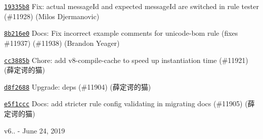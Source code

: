 \begin{DoxyItemize}
\item \href{https://github.com/eslint/eslint/commit/19335b8f47029b2f742d5507ba39484eaf68d07b}{\texttt{ {\ttfamily 19335b8}}} Fix\+: actual message\+Id and expected message\+Id are switched in rule tester (\#11928) (Milos Djermanovic)
\item \href{https://github.com/eslint/eslint/commit/8b216e04fb0dd0a1a4d3730ebe4b24780020b09c}{\texttt{ {\ttfamily 8b216e0}}} Docs\+: Fix incorrect example comments for unicode-\/bom rule (fixes \#11937) (\#11938) (Brandon Yeager)
\item \href{https://github.com/eslint/eslint/commit/cc3885b028e29ebc575c900f43af81cb0dabffb6}{\texttt{ {\ttfamily cc3885b}}} Chore\+: add v8-\/compile-\/cache to speed up instantiation time (\#11921) (薛定谔的猫)
\item \href{https://github.com/eslint/eslint/commit/d8f26886f19a17f2e1cdcb91e2db84fc7ba3fdfb}{\texttt{ {\ttfamily d8f2688}}} Upgrade\+: deps (\#11904) (薛定谔的猫)
\item \href{https://github.com/eslint/eslint/commit/e5f1ccc9e2d07ad0acf149027ffc382021d54da1}{\texttt{ {\ttfamily e5f1ccc}}} Docs\+: add \textquotesingle{}stricter rule config validating\textquotesingle{} in migrating docs (\#11905) (薛定谔的猫)
\end{DoxyItemize}

v6.. -\/ June 24, 2019


